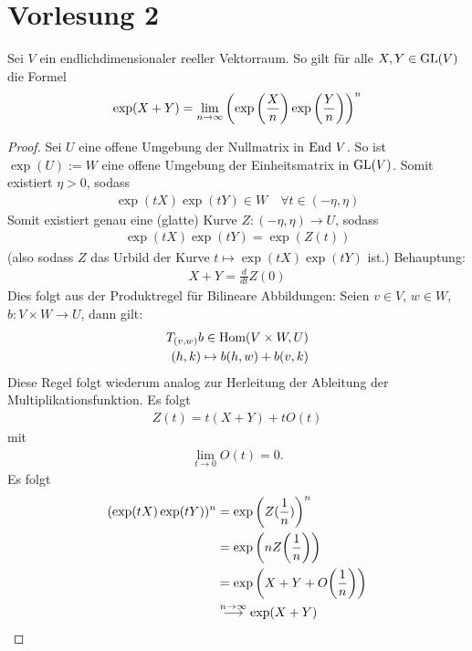 \documentclass{report}
\begin{document}
\section{Vorlesung 2}
\begin{lemma}
	 Sei $V$ ein endlichdimensionaler reeller Vektorraum. So gilt für alle $X,Y \in \textnormal{GL}(V)$ die Formel
	\begin{align*}
		\exp(X + Y) = \lim_{n \to \infty} \qty(\exp\qty(\frac{X}{n}) \exp\qty(\frac{Y}{n}))^n
	\end{align*}
\end{lemma}
\begin{proof}
	Sei $U$ eine offene Umgebung der Nullmatrix in $\textnormal{End}~ V$. So ist $\exp(U) := W$ eine offene Umgebung der Einheitsmatrix in $\textnormal{GL}(V)$. Somit existiert $\eta > 0$, sodass 
	\begin{align*}
		\exp(tX)\exp(tY) \in W \quad \forall t \in (-\eta, \eta)
	\end{align*}
	Somit existiert genau eine (glatte) Kurve $Z : (-\eta, \eta) \to U$, sodass
	\begin{align*}
		\exp(tX)\exp(tY) = \exp(Z(t))
	\end{align*}
	(also sodass $Z$ das Urbild der Kurve $t \mapsto \exp(tX)\exp(tY)$ ist.)
	\newpar
	Behauptung:
	\begin{align*}
		X + Y = \frac{d}{dt} Z(0)
	\end{align*}
	Dies folgt aus der Produktregel für Bilineare Abbildungen: Seien $v \in V$, $w \in W$, $b : V \times W \to U$, dann gilt:
	\begin{align*}
		T_{(v,w)} b \in \textnormal{Hom}(V \times W, U)\\
		(h,k) \mapsto b(h,w) + b(v,k)
	\end{align*}
	Diese Regel folgt wiederum analog zur Herleitung der Ableitung der Multiplikationsfunktion.
	\newpar
	Es folgt
	\begin{align*}
		Z(t) = t(X + Y) + tO(t)
	\end{align*}
	mit 
	\begin{align*}
		\lim_{t \to 0} O(t) = 0.
	\end{align*}
	Es folgt
	\begin{align*}
		(\exp(tX)\exp(tY))^n 
		&= \exp\qty(Z(\frac{1}{n}))^n\\
		&= \exp\qty(n Z \qty(\frac{1}{n}))\\
		&= \exp\qty(X + Y + O\qty(\frac{1}{n}))\\
		&\overset{n \to \infty}{\longrightarrow} \exp(X+Y)
	\end{align*}
\end{proof}
\end{document}
